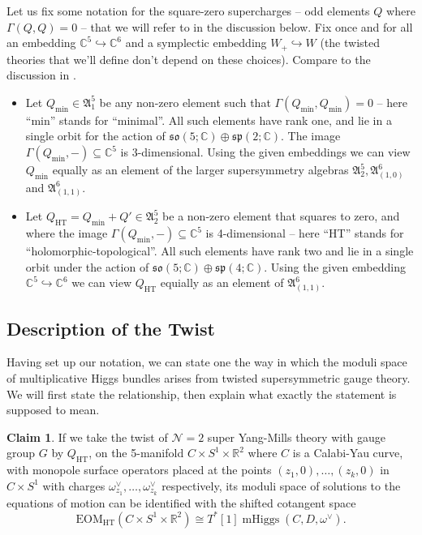 \documentclass[11pt, oneside, reqno]{amsart}
\theoremstyle{definition} \newtheorem{definition}{Definition}[section]
\newtheorem{claimnum}[definition]{Claim}
\theoremstyle{definition} \newtheorem{remark}[definition]{Remark}
\theoremstyle{definition} \newtheorem{remarks}[definition]{Remarks}
\theoremstyle{definition} \newtheorem{question}[definition]{Question}
\theoremstyle{definition} \newtheorem*{note}{Note}
\theoremstyle{definition} \newtheorem{example}[definition]{Example}
\theoremstyle{definition} \newtheorem{examples}[definition]{Examples}
\newcommand{\mr}[1]{\mathrm{#1}}
\newcommand{\mc}[1]{\mathcal{#1}}
\newcommand{\mf}[1]{\mathfrak{#1}}
\newcommand{\inj}{\hookrightarrow}
\newcommand{\CC}{\mathbb{C}}
\newcommand{\RR}{\mathbb{R}}
\newcommand{\so}{\mathfrak{so}}
\renewcommand{\sp}{\mathfrak{sp}}
\newcommand{\sub}{\subseteq}
\newcommand{\iso}{\cong}
\DeclareMathOperator{\mhiggs}{mHiggs}
\newcommand{\HT}{\mr{HT}}
\begin{document}
Let us fix some notation for the square-zero supercharges -- odd elements $Q$ where $\Gamma(Q,Q)=0$ -- that we will refer to in the discussion below.  Fix once and for all an embedding $\CC^5 \inj \CC^6$ and a symplectic embedding $W_+ \inj W$ (the twisted theories that we'll define don't depend on these choices).  Compare to the discussion in \cite[4.2.5--4.2.6]{ElliottSafronov}.
\begin{itemize}
 \item Let $Q_{\mr{min}} \in \mf A^5_1$ be any non-zero element such that $\Gamma(Q_{\mr{min}},Q_{\mr{min}})=0$ -- here ``min'' stands for ``minimal''.  All such elements have rank one, and lie in a single orbit for the action of $\so(5;\CC) \oplus \sp(2;\CC)$.  The image $\Gamma(Q_{\mr{min}}, -) \sub \CC^5$ is 3-dimensional.  Using the given embeddings we can view $Q_{\mr{min}}$ equally as an element of the larger supersymmetry algebras $\mf A^5_2, \mf A^6_{(1,0)}$ and $\mf A^6_{(1,1)}$.
 \item Let $Q_{\mr{HT}} = Q_{\mr{min}} + Q' \in \mf A^5_2$ be a non-zero element that squares to zero, and where the image $\Gamma(Q_{\mr{min}}, -) \sub \CC^5$ is 4-dimensional -- here ``HT'' stands for ``holomorphic-topological''.  All such elements have rank two and lie in a single orbit under the action of $\so(5;\CC) \oplus \sp(4;\CC)$.  Using the given embedding $\CC^5 \inj \CC^6$ we can view $Q_{\HT}$ equially as an element of $\mf A^6_{(1,1)}$.
\end{itemize}

\subsection{Description of the Twist}
Having set up our notation, we can state one the way in which the moduli space of multiplicative Higgs bundles arises from twisted supersymmetric gauge theory.  We will first state the relationship, then explain what exactly the statement is supposed to mean.

\begin{claimnum} \label{twist_claim}
If we take the twist of $\mc N=2$ super Yang-Mills theory with gauge group $G$ by $Q_\HT$, on the 5-manifold $C \times S^1 \times \RR^2$ where $C$ is a Calabi-Yau curve, with monopole surface operators placed at the points $(z_1,0), \ldots, (z_k,0)$ in $C \times S^1$ with charges $\omega^\vee_{z_1}, \ldots, \omega^\vee_{z_k}$ respectively, its moduli space of solutions to the equations of motion can be identified with the shifted cotangent space
\[\mr{EOM}_\HT(C \times S^1 \times \RR^2) \iso T^*[1]\mhiggs(C,D,\omega^\vee).\]
\end{claimnum}
\end{document}
